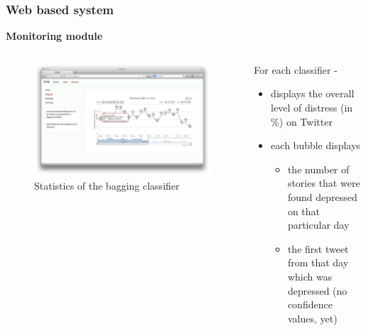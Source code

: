 \documentclass[9pt]{beamer}
\begin{document}
    \begin{frame}
        \frametitle{Web based system}
        \begin{center}
            \textbf{Monitoring module}
        \end{center}
        \begin{columns}
            \begin{column}{0.5\textwidth}
                \begin{figure}
                    \centering
                    \includegraphics[width=\textwidth]{figures/monitoring_bagging_tweet_info.png}
                    \caption{Statistics of the bagging classifier}
                \end{figure}
            \end{column}
            \begin{column}{0.5\textwidth}
                For each classifier -
                \begin{itemize}
                    \item{displays the overall level of distress (in \%) on Twitter}
                    \item{
                    each bubble displays
                    \begin{itemize}
                        \item{the number of stories that were found depressed on that particular day}
                        \item{the first tweet from that day which was depressed (no confidence values, yet)}
                    \end{itemize}
                    }
                \end{itemize}
            \end{column}
        \end{columns}
    \end{frame}
    
\end{document}
